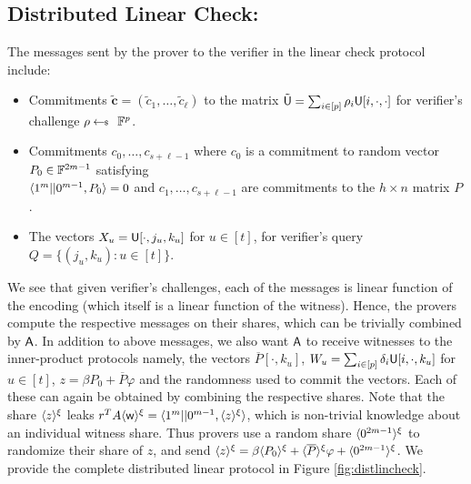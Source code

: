 \subsection{Distributed Linear Check:} The messages sent by the prover to the
verifier in the linear check protocol include:
\begin{itemize}
	\item Commitments $\tilde{\bm{c}} = (\tilde{c}_1,\ldots,\tilde{c}_\ell)$ to the matrix $\tilde{\ewit}=
	\sum_{i\in [p]}\rho_i\ewit[i,\cdot,\cdot]$ for verifier's challenge $\rho\sample
	\FF^p$.
	\item Commitments $c_0,\ldots,c_{s+\ell-1}$ where $c_0$ is a commitment to random
	vector $P_0\in \FF^{2m-1}$ satisfying\\ $\innp{1^m||0^{m-1}}{P_0}=0$ and
	$c_1,\ldots,c_{s+\ell-1}$ are commitments to the $h\times n$ matrix $P$.
	\item The vectors $X_u=\ewit[\cdot,j_u,k_u]$ for $u\in [t]$, for verifier's
	query $Q=\{(j_u,k_u):u\in [t]\}$.
\end{itemize}
We see that given verifier's challenges, each of the messages is linear function
of the encoding (which itself is a linear function of the witness). Hence, the
provers compute the respective messages on their shares, which can be trivially
combined by $\Ag$. In addition to above messages, we also want $\Ag$ to receive
witnesses to the inner-product protocols namely, the vectors
$\overline{P}[\cdot,k_u]$, $W_u=\sum_{i\in [p]}\delta_i\ewit[i,\cdot,k_u]$ for
$u\in [t]$, $z=\beta P_0+\overline{P}\varphi$ and the randomness used to commit
the vectors. Each of these can again be obtained by combining the respective shares.
Note that the share $\shr{z}$ leaks $r^TA\shr{\wit}=\innp{1^m||0^{m-1}}{\shr{z}}$, which
is non-trivial knowledge about an individual witness share. Thus provers use a
random share $\shr{0^{2m-1}}$ to randomize their share of $z$, and send
$\shr{z}=\beta\shr{P_0}+\shr{\overline{P}}\varphi+\shr{0^{2m-1}}$. 
We provide the complete distributed linear protocol in Figure
\ref{fig:distlincheck}.%


